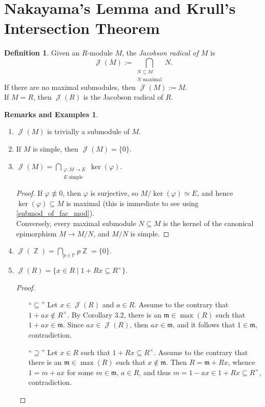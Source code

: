 \documentclass[12pt,a4paper]{report}
\theoremstyle{definition}
\newtheorem{defn}[theorem]{Definition}
\newtheorem*{remex}{Remarks and Examples}
\theoremstyle{num.custom-title}
\DeclareMathOperator{\J}{\mathcal{J}}
\DeclareMathOperator{\Z}{\mathbb{Z}}
\DeclareMathOperator{\sse}{\subseteq}
\newcommand{\m}{\mathfrak{m}}
\renewcommand{\phi}{\varphi}
\renewcommand{\P}{\mathbb{P}}
\begin{document}
\section{Nakayama's Lemma and Krull's Intersection Theorem}

\begin{defn}
Given an $R$-module $M$, the \emph{Jacobson radical of $M$} is
\[
\J(M):= \bigcap_{\substack{N \sse M \\ N \text{ maximal}}} N.
\]
If there are no maximal submodules, then $\J(M):=M$.\\
If $M=R$, then $\J(R)$ is the Jacobson radical of $R$.
\end{defn}

\begin{remex}\ 
\begin{enumerate}
\item $\J(M)$ is trivially a submodule of $M$.
\item If $M$ is simple, then $\J(M)= \{0\}$.
\item $\J(M) = \displaystyle\bigcap_{\substack{\phi : M \to E \\ E \text{ simple}}} \ker (\phi)$.
\begin{proof}
If $\phi \not\equiv 0$, then $\phi$ is surjective, so $M/\ker(\phi) \simeq E$, and hence $\ker(\phi) \sse M$ is maximal (this is immediate to see using \ref{submod_of_fac_mod}).\\
Conversely, every maximal submodule $N \sse M$ is the kernel of the canonical epimorphism $M \to M/N$, and $M/N$ is simple.
\end{proof}
\item $\J(\Z) = \displaystyle\bigcap_{p \in \P} p\Z = \{0\}$.
\item $\J(R) = \{ x \in R \mid 1+Rx \sse R^\times \}$.
\begin{proof}\ 
\begin{itemize}
\item[``$\sse$''] Let $x \in \J(R)$ and $a \in R$. Assume to the contrary that $1+ax \not\in R^\times$. By Corollary 3.2, there is an $\m \in \max(R)$ such that $1+ax \in \m$. Since $ax \in \J(R)$, then $ax \in \m$, and it follows that $1 \in \m$, contradiction.
\item[``$\supseteq$''] Let $x \in R$ such that $1+Rx \sse R^\times$. Assume to the contrary that there is an $\m \in \max(R)$ such that $x \not\in \m$. Then $R=\m+Rx$, whence $1=m+ax$ for some $m \in \m$, $a \in R$, and thus $m = 1-ax \in 1+Rx \sse R^\times$, contradiction.
\end{itemize}
\end{proof}
\end{enumerate}
\end{remex}
\end{document}
